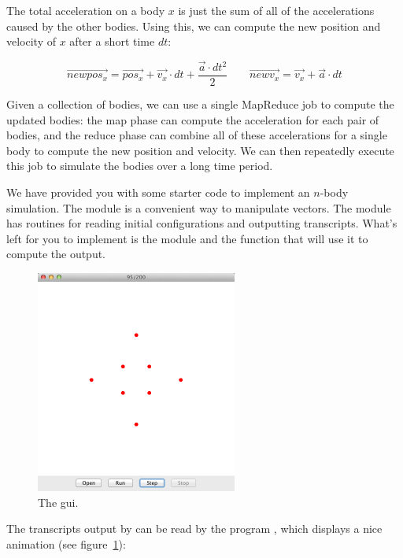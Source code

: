 \documentclass{pset}
\newcommand{\widevec}[1]{\overrightarrow{#1}}
\begin{document}
The total acceleration on a body $x$ is just the sum of all of the accelerations
caused by the other bodies.  Using this, we can compute the new position and
velocity of $x$ after a short time $dt$:

\begin{displaymath}
\widevec{newpos_x} = \widevec{pos_x} + \widevec{v_x} \cdot dt + \frac{\widevec{a} \cdot dt^2}{2}
\qquad
\widevec{newv_x} = \widevec{v_x} + \widevec{a} \cdot dt
\end{displaymath}

Given a collection of bodies, we can use a single MapReduce job to compute the
updated bodies: the map phase can compute the acceleration for each pair of
bodies, and the reduce phase can combine all of these accelerations for a single
body to compute the new position and velocity.  We can then repeatedly execute
this job to simulate the bodies over a long time period.

We have provided you with some starter code to implement an $n$-body
simulation.  The  module is a convenient way to
manipulate vectors.
  The  module has routines for reading initial
configurations and outputting transcripts.
What's left for you to implement is the  module and the
 function that will use it to compute the output.

\begin{figure}
\begin{center}
\includegraphics{nbody-gui.png}
\end{center}
\caption{The  gui.}
\label{fig:bouncy}
\end{figure}


The transcripts output by  can be read by
the program , which displays a nice animation (see
figure~\ref{fig:bouncy}):
\end{document}
